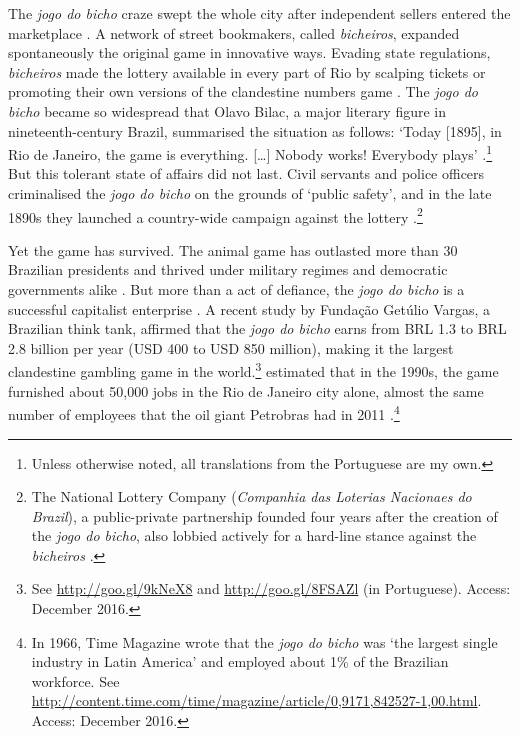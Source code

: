 The \emph{jogo do bicho} craze swept the whole city after independent sellers entered the marketplace \citep{magalhaes2005ganhou, soares1993jogo}. A network of street bookmakers, called \emph{bicheiros}, expanded spontaneously the original game in innovative ways. Evading state regulations, \emph{bicheiros} made the lottery available in every part of Rio by scalping tickets or promoting their own versions of the clandestine numbers game  \citep[37]{chazkel2011laws}. The \emph{jogo do bicho} became so widespread that Olavo Bilac, a major literary figure in nineteenth-century Brazil, summarised the situation as follows: `Today {[}1895{]}, in Rio de Janeiro, the game is everything. {[}\ldots{}{]} Nobody works! Everybody plays' \citep[43]{pacheco1957antologia}.\footnote{Unless otherwise noted, all translations from the Portuguese are my own.} But this tolerant state of affairs did not last. Civil servants and police officers criminalised the \emph{jogo do bicho} on the grounds of `public safety', and in the late 1890s they launched a country-wide campaign against the lottery \citep{benatte2002jogos, krelling2014jogos, villar2008contravencao}.\footnote{The National Lottery Company (\emph{Companhia das Loterias Nacionaes do Brazil}), a public-private partnership founded four years after the creation of the \emph{jogo do bicho}, also lobbied actively for a hard-line stance against the \emph{bicheiros} \citep[82]{da1999aguias}.}

Yet the game has survived. The animal game has outlasted more than 30 Brazilian presidents and thrived under military regimes and democratic governments alike \citep{gaspari2002ditadura, jupiara2015poroes}. But more than a act of defiance, the \emph{jogo do bicho} is a successful capitalist enterprise \citep{labronici2014sorteio, magalhaes2005ganhou}. A recent study by Fundação Getúlio Vargas, a Brazilian think tank, affirmed that the \emph{jogo do bicho} earns from BRL 1.3 to BRL 2.8 billion per year (USD 400 to USD 850 million), making it the largest clandestine gambling game in the world.\footnote{See \url{http://goo.gl/9kNeX8} and \url{http://goo.gl/8FSAZl} (in Portuguese). Access: December 2016.} \citet[171]{schneider1996brazil} estimated that in the 1990s, the game furnished about 50,000 jobs in the Rio de Janeiro city alone, almost the same number of employees that the oil giant Petrobras had in 2011 \citep{exame2013petrobras}.\footnote{In 1966, Time Magazine wrote that the \emph{jogo do bicho} was `the largest single industry in Latin America' and employed about 1\% of the Brazilian workforce. See \url{http://content.time.com/time/magazine/article/0,9171,842527-1,00.html}. Access: December 2016.}


